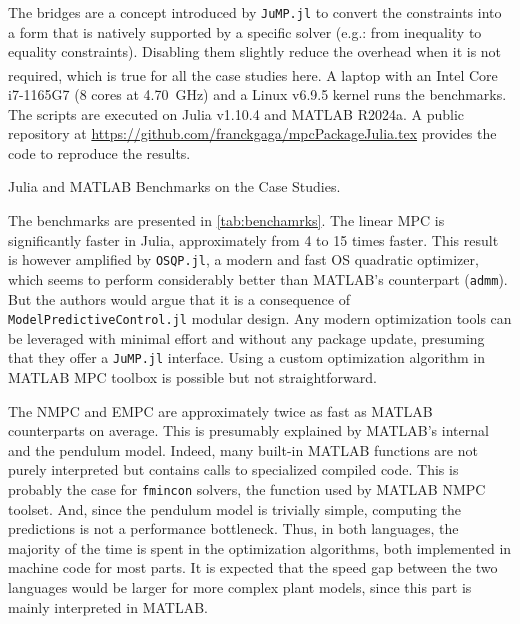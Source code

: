The bridges are a concept introduced by \texttt{JuMP.jl} to convert the constraints into a form that is natively supported by a specific solver (e.g.: from inequality to equality constraints). Disabling them slightly reduce the overhead when it is not required, which is true for all the case studies here. A laptop with an Intel\textsuperscript{\textregistered} Core\textsuperscript{\texttrademark} i7-1165G7 (8 cores at \SI{4.70}{\giga\hertz}) and a Linux v6.9.5 kernel runs the benchmarks. The scripts are executed on Julia v1.10.4 and MATLAB R2024a. A public repository at \url{https://github.com/franckgaga/mpcPackageJulia.tex} provides the code to reproduce the results. 

\begin{table}
    \centering
    \caption{Julia and MATLAB Benchmarks on the Case Studies.}
    \label{tab:benchamrks}
    \centering
	
\end{table}

The benchmarks are presented in \cref{tab:benchamrks}. The linear MPC is significantly faster in Julia, approximately from 4 to 15 times faster. This result is however amplified by \texttt{OSQP.jl}, a modern and fast OS quadratic optimizer, which seems to perform considerably better than MATLAB's counterpart (\texttt{admm}). But the authors would argue that it is a consequence of \texttt{ModelPredictiveControl.jl} modular design. Any modern optimization tools can be leveraged with minimal effort and without any package update, presuming that they offer a \texttt{JuMP.jl} interface. Using a custom optimization algorithm in MATLAB MPC toolbox is possible but not straightforward.

The NMPC and EMPC are approximately twice as fast as MATLAB counterparts on average. This is presumably explained by MATLAB's internal and the pendulum model. Indeed, many built-in MATLAB functions are not purely interpreted but contains calls to specialized compiled code. This is probably the case for \texttt{fmincon} solvers, the function used by MATLAB NMPC toolset. And, since the pendulum model is trivially simple, computing the predictions is not a performance bottleneck. Thus, in both languages, the majority of the time is spent in the optimization algorithms, both implemented in machine code for most parts. It is expected that the speed gap between the two languages would be larger for more complex plant models, since this part is mainly interpreted in MATLAB.
